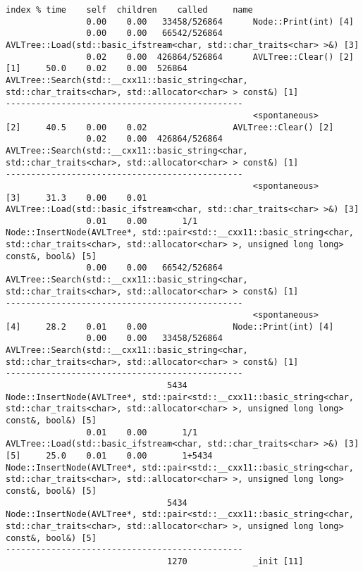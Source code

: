 \documentclass[12pt]{article}
\begin{document}
\begin{lstlisting}
index % time    self  children    called     name
                0.00    0.00   33458/526864      Node::Print(int) [4]
                0.00    0.00   66542/526864      AVLTree::Load(std::basic_ifstream<char, std::char_traits<char> >&) [3]
                0.02    0.00  426864/526864      AVLTree::Clear() [2]
[1]     50.0    0.02    0.00  526864         AVLTree::Search(std::__cxx11::basic_string<char, std::char_traits<char>, std::allocator<char> > const&) [1]
-----------------------------------------------
                                                 <spontaneous>
[2]     40.5    0.00    0.02                 AVLTree::Clear() [2]
                0.02    0.00  426864/526864      AVLTree::Search(std::__cxx11::basic_string<char, std::char_traits<char>, std::allocator<char> > const&) [1]
-----------------------------------------------
                                                 <spontaneous>
[3]     31.3    0.00    0.01                 AVLTree::Load(std::basic_ifstream<char, std::char_traits<char> >&) [3]
                0.01    0.00       1/1           Node::InsertNode(AVLTree*, std::pair<std::__cxx11::basic_string<char, std::char_traits<char>, std::allocator<char> >, unsigned long long> const&, bool&) [5]
                0.00    0.00   66542/526864      AVLTree::Search(std::__cxx11::basic_string<char, std::char_traits<char>, std::allocator<char> > const&) [1]
-----------------------------------------------
                                                 <spontaneous>
[4]     28.2    0.01    0.00                 Node::Print(int) [4]
                0.00    0.00   33458/526864      AVLTree::Search(std::__cxx11::basic_string<char, std::char_traits<char>, std::allocator<char> > const&) [1]
-----------------------------------------------
                                5434             Node::InsertNode(AVLTree*, std::pair<std::__cxx11::basic_string<char, std::char_traits<char>, std::allocator<char> >, unsigned long long> const&, bool&) [5]
                0.01    0.00       1/1           AVLTree::Load(std::basic_ifstream<char, std::char_traits<char> >&) [3]
[5]     25.0    0.01    0.00       1+5434    Node::InsertNode(AVLTree*, std::pair<std::__cxx11::basic_string<char, std::char_traits<char>, std::allocator<char> >, unsigned long long> const&, bool&) [5]
                                5434             Node::InsertNode(AVLTree*, std::pair<std::__cxx11::basic_string<char, std::char_traits<char>, std::allocator<char> >, unsigned long long> const&, bool&) [5]
-----------------------------------------------
                                1270             _init [11]

\end{lstlisting}
\end{document}
